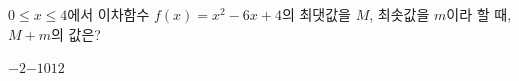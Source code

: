 $0\le x\le 4$에서 이차함수 $f(x)=x^2-6x+4$의 최댓값을 $M$, 최솟값을 $m$이라 할 때, $M+m$의 값은?
\begin{choices32}{$-2$}{$-1$}{$0$}{$1$}{$2$}\end{choices32}
